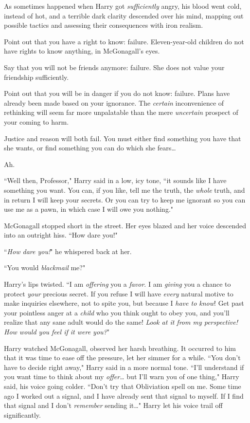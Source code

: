 As sometimes happened when Harry got \emph{sufficiently} angry, his blood went cold, instead of hot, and a terrible dark clarity descended over his mind, mapping out possible tactics and assessing their consequences with iron realism.

\begin{em}
Point out that you have a right to know: failure. Eleven-year-old children do not have rights to know anything, in McGonagall's eyes.

Say that you will not be friends anymore: failure. She does not value your friendship sufficiently.

Point out that you will be in danger if you do not know: failure. Plans have already been made based on your ignorance. The \emph{certain} inconvenience of rethinking will seem far more unpalatable than the mere \emph{uncertain} prospect of your coming to harm.

Justice and reason will both fail. You must either find something you have that she wants, or find something you can do which she fears{\ldots}
\end{em}

Ah.

``Well then, Professor," Harry said in a low, icy tone, ``it sounds like I have something you want. You can, if you like, tell me the truth, the \emph{whole} truth, and in return I will keep your secrets. Or you can try to keep me ignorant so you can use me as a pawn, in which case I will owe you nothing."

McGonagall stopped short in the street. Her eyes blazed and her voice descended into an outright hiss. ``How dare you!"

``\emph{How dare you!}" he whispered back at her.

``You would \emph{blackmail} me?"

Harry's lips twisted. ``I am \emph{offering} you a \emph{favor}. I am \emph{giving} you a chance to protect \emph{your} precious secret. If you refuse I will have \emph{every} natural motive to make inquiries elsewhere, not to spite you, but because I \emph{have to know}! Get past your pointless anger at a \emph{child} who you think ought to obey you, and you'll realize that any sane adult would do the same! \emph{Look at it from my perspective! How would you feel if it were \emph{you}?}"

Harry watched McGonagall, observed her harsh breathing. It occurred to him that it was time to ease off the pressure, let her simmer for a while. ``You don't have to decide right away," Harry said in a more normal tone. ``I'll understand if you want time to think about my \emph{offer{\ldots}} but I'll warn you of one thing," Harry said, his voice going colder. ``Don't try that Obliviation spell on me. Some time ago I worked out a signal, and I have already sent that signal to myself. If I find that signal and I don't \emph{remember} sending it{\ldots}" Harry let his voice trail off significantly.

